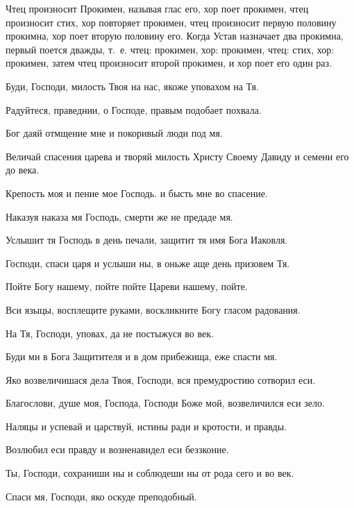 \begin{mymulticols}
{Чтец произносит Прокимен, называя глас его, хор поет прокимен, чтец произносит стих, хор повторяет прокимен, чтец произносит первую половину прокимна, хор поет вторую половину его. Когда Устав назначает два прокимна, первый поется дважды, т.~е. чтец: прокимен, хор: прокимен, чтец: стих, хор: прокимен, затем чтец произносит второй прокимен, и хор поет его один раз.}


 Буди, Господи, милость Твоя на нас, якоже уповахом на Тя.

 Радуйтеся, праведнии, о Господе, правым подобает похвала.

 Бог даяй отмщение мне и покоривый люди под мя.

 Величай спасения царева и творяй милость Христу Своему Давиду и семени его до века.

 Крепость моя и пение мое Господь. и бысть мне во спасение.

 Наказуя наказа мя Господь, смерти же не предаде мя.

 Услышит тя Господь в день печали, защитит тя имя Бога Иаковля.

 Господи, спаси царя и услыши ны, в оньже аще день призовем Тя.

 Пойте Богу нашему, пойте пойте Цареви нашему, пойте.

 Вси языцы, восплещите руками, воскликните Богу гласом радования.

 На Тя, Господи, уповах, да не постыжуся во век.

 Буди ми в Бога Защитителя и в дом прибежища, еже спасти мя.

 Яко возвеличишася дела Твоя, Господи, вся премудростию сотворил еси.

 Благослови, душе моя, Господа, Господи Боже мой, возвеличился еси зело.

 Наляцы и успевай и царствуй, истины ради и кротости, и правды.

 Возлюбил еси правду и возненавидел еси беззконие.

 Ты, Господи, сохраниши ны и соблюдеши ны от рода сего и во век.

 Спаси мя, Господи, яко оскуде преподобный.


\end{mymulticols}
